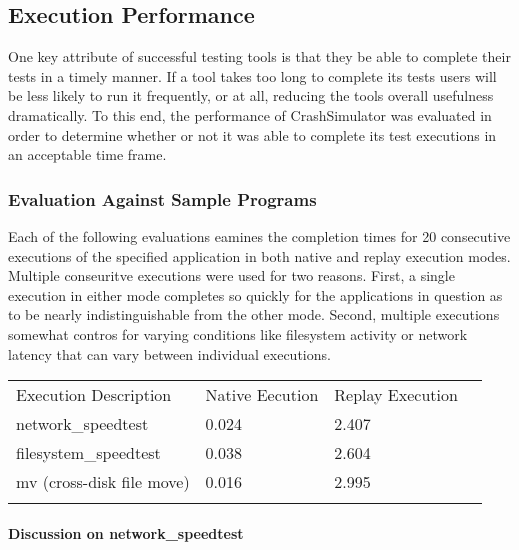     \subsection{Execution Performance}

        One key attribute of successful testing tools is that they be able to complete their tests in a timely manner.
        If a tool takes too long to complete its tests users will be less likely to run it frequently, or at all,
        reducing the tools overall usefulness dramatically. To this end, the performance of CrashSimulator was evaluated
        in order to determine whether or not it was able to complete its test executions in an acceptable time frame.

        \subsubsection{Evaluation Against Sample Programs}

        Each of the following evaluations eamines the completion times for 20 consecutive executions of the specified
        application in both native and replay execution modes.  Multiple conseuritve executions were used for two
        reasons.  First, a single execution in either mode completes so quickly for the applications in question as to
        be nearly indistinguishable from the other mode.  Second, multiple executions somewhat contros for varying
        conditions like filesystem activity or network latency that can vary between individual executions.

            \begin{table}[H]
                \scriptsize{}
                \begin{tabular}{l  l  l  l}
                    \toprule{}
                        Execution Description & Native Eecution & Replay Execution\\
                        network\_speedtest & 0.024 & 2.407 \\
                        filesystem\_speedtest & 0.038 & 2.604 \\
                        mv (cross-disk file move) & 0.016 & 2.995 \\
                    \bottomrule{}
                \end{tabular}
            \end{table}

        \paragraph{Discussion on network\_speedtest}

